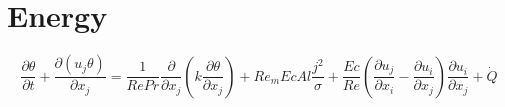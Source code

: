 \documentclass[11pt]{article}
\begin{document}







\section{Energy}
\Large
\begin{equation}
	\frac{\partial \theta}{\partial t} +
	\frac{\partial (u_j \theta)}{\partial x_j}
	=
	\frac{1}{Re Pr}
	\frac{\partial}{\partial x_j}
	\left(
	k \frac{\partial \theta}{\partial x_j}
	\right) +
	Re_m Ec Al
	\frac{{j}^2}{\sigma} +
	\frac{Ec}{Re}
	\left(
	\frac{\partial u_j}{\partial x_i}
	-
	\frac{\partial u_i}{\partial x_j}
	\right)
	\frac{\partial u_i}{\partial x_j} +
	\dot{Q}
\end{equation}
\end{document}
